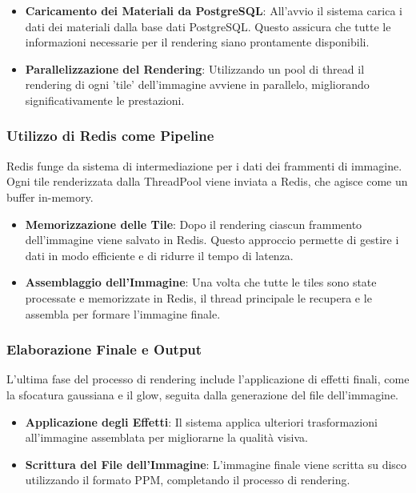 \documentclass[12pt]{article}
\begin{document}
\begin{itemize}
\item \textbf{Caricamento dei Materiali da PostgreSQL}: All'avvio il sistema carica i dati dei materiali dalla base dati PostgreSQL. Questo assicura che tutte le informazioni necessarie per il rendering siano prontamente disponibili.
\item \textbf{Parallelizzazione del Rendering}: Utilizzando un pool di thread il rendering di ogni 'tile' dell'immagine avviene in parallelo, migliorando significativamente le prestazioni.
\end{itemize}

\subsubsection{Utilizzo di Redis come Pipeline}
Redis funge da sistema di intermediazione per i dati dei frammenti di immagine. Ogni tile renderizzata dalla ThreadPool viene inviata a Redis, che agisce come un buffer in-memory.

\begin{itemize}
\item \textbf{Memorizzazione delle Tile}: Dopo il rendering ciascun frammento dell'immagine viene salvato in Redis. Questo approccio permette di gestire i dati in modo efficiente e di ridurre il tempo di latenza.
\item \textbf{Assemblaggio dell'Immagine}: Una volta che tutte le tiles sono state processate e memorizzate in Redis, il thread principale le recupera e le assembla per formare l'immagine finale.
\end{itemize}

\subsubsection{Elaborazione Finale e Output}
L'ultima fase del processo di rendering include l'applicazione di effetti finali, come la sfocatura gaussiana e il glow, seguita dalla generazione del file dell'immagine.

\begin{itemize}
\item \textbf{Applicazione degli Effetti}: Il sistema applica ulteriori trasformazioni all'immagine assemblata per migliorarne la qualità visiva.

\item \textbf{Scrittura del File dell'Immagine}: L'immagine finale viene scritta su disco utilizzando il formato PPM, completando il processo di rendering.
\end{itemize}
\end{document}
